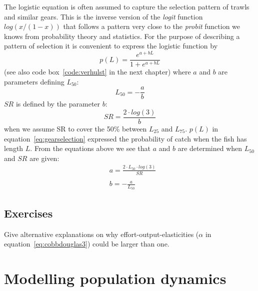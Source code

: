 \documentclass[11pt,fleqn]{book} %
\begin{document}
The logistic equation is often assumed to capture the selection pattern of trawls and similar gears. This is the inverse version of the \textit{logit} function $log(x/(1-x))$ that follows a pattern very close to the \textit{probit} function we knows from probability theory and statistics. For the purpose of describing a pattern of selection it is convenient to express the logistic function by
\begin{equation} 
\label{eq:gearselection}
p(L) = \frac{e^{a + b L}}{1 + e^{a + b L}}
\end{equation}
(see also code box~\ref{code:verhulst} in the next chapter) where $a$ and $b$ are parameters defining $L_{50}$:
\begin{equation} 
L_{50} = - \frac{a}{b}
\end{equation}
$SR$ is defined by the parameter $b$:
\begin{equation} 
SR = \frac{2 \cdot log(3)}{b}
\end{equation}
when we assume SR to cover the 50\% between $L_{25}$ and $L_{75}$. $p(L)$ in equation~\ref{eq:gearselection} expressed the probability of catch when the fish has length $L$. From the equations above we see that $a$ and $b$ are determined when $L_{50}$ and $SR$ are given:
\begin{equation}
\label{eq:ablogistic}
\begin{aligned} & a = \frac{2 \cdot L_{50} \cdot log(3)}{SR} \\\\
& b = - \frac{a}{L_{50}}
\end{aligned}
\end{equation}

\section*{Exercises}

\begin{exercise}
Give alternative explanations on why effort-output-elasticities ($\alpha$ in equation~\ref{eq:cobbdouglas3}) could be larger than one.
\end{exercise}


\chapter{Modelling population dynamics} \label{chapter 4}
\end{document}
